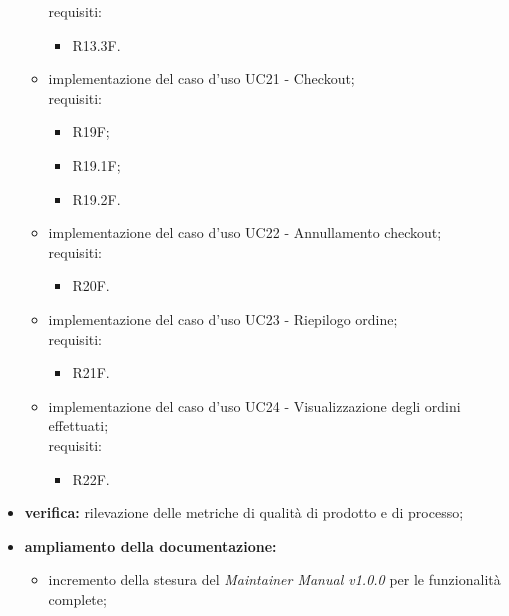 \begin{itemize}
\begin{itemize}
                    requisiti:
                    \begin{itemize}
                        \item R13.3F.
                    \end{itemize}
              \item implementazione del caso d'uso UC21 - Checkout;\\
                    requisiti:
                    \begin{itemize}
                        \item R19F;
                        \item R19.1F;
                        \item R19.2F.
                    \end{itemize}
              \item implementazione del caso d'uso UC22 -  Annullamento checkout;\\
                    requisiti:
                    \begin{itemize}
                        \item R20F.
                    \end{itemize}
              \item implementazione del caso d'uso UC23 -  Riepilogo ordine;\\
                    requisiti:
                    \begin{itemize}
                        \item R21F.
                    \end{itemize}
              \item implementazione del caso d'uso UC24 - Visualizzazione degli ordini effettuati;\\
                    requisiti:
                    \begin{itemize}
                        \item R22F.
                    \end{itemize}
          \end{itemize}
    \item \textbf{verifica:} rilevazione delle metriche di qualità di prodotto e di processo;
    \item \textbf{ampliamento della documentazione:}
          \begin{itemize}
              \item incremento della stesura del \textit{Maintainer Manual v1.0.0} per le funzionalità complete;

\end{itemize}
\end{itemize}
